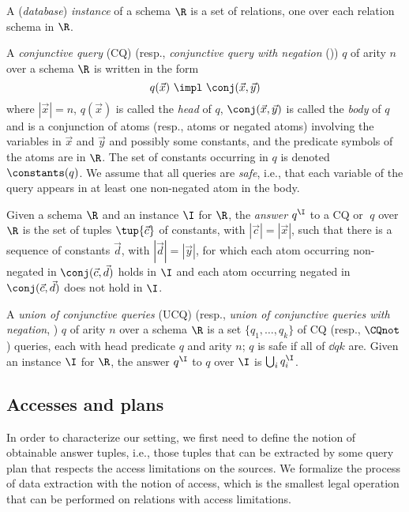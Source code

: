 A (\emph{database}) \emph{instance} of a schema $\R$ is a set of relations, one over each relation schema in $\R$.

A \emph{conjunctive query} (CQ) (resp., \emph{conjunctive query with negation} (\CQnot)) $q$ of arity $n$ over a schema $\R$ is written in the form $$q(\vec x) ~\impl~ \conj(\vec x,\vec y)$$ where $|\vec x|=n$, $q(\vec x)$ is called the \emph{head} of $q$, $\conj(\vec x,\vec y)$ is called the \emph{body} of $q$ and is a conjunction of atoms (resp., atoms or negated atoms) involving the variables in $\vec x$ and $\vec y$ and possibly some constants, and the predicate symbols of the atoms are in $\R$. The set of constants occurring in $q$ is denoted $\constants(q)$. We assume that all queries are \emph{safe}, i.e., that each variable of the query appears in at least one non-negated atom in the body.

Given a schema $\R$ and an instance $\I$ for $\R$, the \emph{answer} $q^\I$ to a CQ or \CQnot $\;q$ over $\R$ is the set of tuples $\tup{\vec c}$ of constants, with $|\vec c|=|\vec x|$, such that there is a sequence of constants $\vec d$, with $|\vec d|=|\vec y|$, for which each atom occurring non-negated in $\conj(\vec c,\vec d)$ holds in $\I$ and each atom occurring negated in $\conj(\vec c,\vec d)$ does not hold in $\I$.

A \emph{union of conjunctive queries} (UCQ) (resp., \emph{union of conjunctive queries with negation}, \UCQnot) $q$ of arity $n$ over a schema $\R$ is a set $\{q_{1},\dots,q_{k}\}$ of CQ (resp., $\mbox{\CQnot}$) queries, each with head predicate $q$ and arity $n$; $q$ is safe if all of $\dd{q}{k}$ are. Given an instance $\I$ for $\R$, the answer $q^\I$ to $q$ over $\I$ is $\bigcup_i q_i^\I$.

\subsection{Accesses and plans}\label{subsec:accesses-plans}

In order to characterize our setting, we first need to define the notion of obtainable answer tuples, i.e., those tuples that can be extracted by some query plan that respects the access limitations on the sources.
We formalize the process of data extraction with the notion of access, which is the smallest legal operation that can be performed on relations with access limitations.

